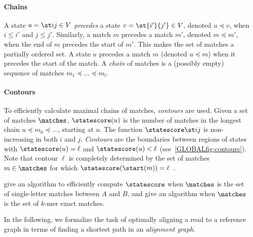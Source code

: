 \paragraph{Chains}
A state $u=\st ij\in V$ \emph{precedes} a state $v=\st {i'}{j'}\in V$, denoted
$u\preceq v$, when $i\leq i'$ and $j\leq j'$. Similarly, a match $m$ precedes a
match $m'$, denoted $m\preceq m'$, when the end of $m$ precedes the start of
$m'$. This makes the set of matches a partially ordered set.
A state $u$ precedes a match $m$ (denoted $u\preceq m$) when it precedes
the start of the match. A \emph{chain} of matches is a (possibly empty) sequence
of matches $m_1 \preceq \dots \preceq m_l$.

\paragraph{Contours}
To efficiently calculate maximal chains of matches, \emph{contours} are used.
Given a set of matches $\matches$, $\statescore(u)$ is the number of matches in
the longest chain $u\preceq m_0 \preceq \dots$, starting at $u$. The function
$\statescore\st ij$ is non-increasing in both $i$ and $j$. \emph{Contours} are
the boundaries between regions of states with $\statescore(u) = \ell$ and
$\statescore(u)<\ell$ (see~\cref{GLOBALfig:contours}). Note that contour $\ell$ is
completely determined by the set of matches $m\in \matches$ for which
${\statescore(\start(m)) = \ell}$~\citep{hirschberg1977algorithms}.

\citet{hunt1977fast} give an algorithm to efficiently compute $\statescore$ when
$\matches$ is the set of single-letter matches between $A$ and $B$, and
\citet{deorowicz2014efficient} give an algorithm when $\matches$ is the set of
$k$-mer exact matches.


In the following, we formalize the task of optimally aligning a read to a
reference graph in terms of finding a shortest path in an \emph{alignment
graph}.

